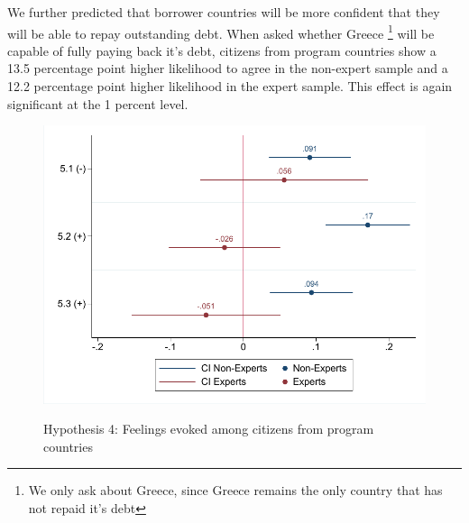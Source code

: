 We further predicted that borrower countries will be more confident that they will be able to repay outstanding debt. 
 When asked whether Greece \footnote{We only ask about Greece, since Greece remains the only country that has not repaid it's debt} will be capable of fully paying back it's debt, citizens from program countries show a 13.5 percentage point higher likelihood to agree in the non-expert sample and a 12.2 percentage point higher likelihood in the expert sample. This effect is again significant at the 1 percent level. \\
 \begin{figure} [h!]
    \begin{center}
    \caption{Hypothesis 4: Feelings evoked among citizens from program countries}
    \includegraphics[scale=0.8]{Question5_1_base.pdf}
    \label{fig:my_label}
    \end{center}
    \tiny
\end{figure}

